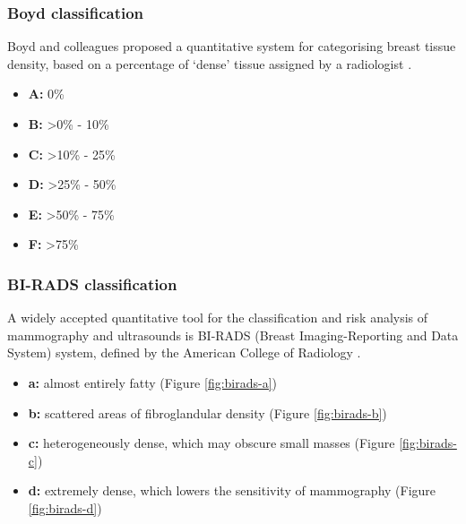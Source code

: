 \subsubsection{Boyd classification}

Boyd and colleagues proposed a quantitative system for categorising breast tissue density, based on a percentage of `dense' tissue assigned by a radiologist \cite{Boyd_Byng_Jong_Fishell_Little_Miller_Lockwood_Tritchler_Yaffe_1995}.

\begin{itemize}
  \item \textbf{A: } 0\%
  \item \textbf{B: } \textgreater 0\% - 10\%
  \item \textbf{C: } \textgreater 10\% - 25\%
  \item \textbf{D: } \textgreater 25\% - 50\%
  \item \textbf{E: } \textgreater 50\% - 75\%
  \item \textbf{F: } \textgreater 75\%
\end{itemize}

\subsubsection{BI-RADS classification}
\label{sssec:bi-rads}

A widely accepted quantitative tool for the classification and risk analysis of mammography and ultrasounds is BI-RADS (Breast Imaging-Reporting and Data System) system, defined by the American College of Radiology \cite{sickles2013acr}.

\begin{itemize}
  \item \textbf{a: } almost entirely fatty (Figure \ref{fig:birads-a})
  \item \textbf{b: } scattered areas of fibroglandular density (Figure \ref{fig:birads-b})
  \item \textbf{c: } heterogeneously dense, which may obscure small masses (Figure \ref{fig:birads-c})
  \item \textbf{d: } extremely dense, which lowers the sensitivity of mammography (Figure \ref{fig:birads-d})
\end{itemize}


